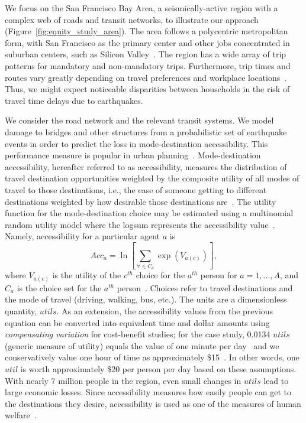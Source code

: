 We focus on the San Francisco Bay Area, a seismically-active region with a complex web of roads and transit networks, to illustrate our approach (Figure~\ref{fig:equity_study_area}). The area follows a polycentric metropolitan form, with San Francisco as the primary center and other jobs  concentrated in suburban centers, such as Silicon Valley~\cite{cervero_polycentrism_1997}. The region has a wide array of trip patterns for mandatory and non-mandatory trips. Furthermore, trip times and routes vary greatly depending on travel preferences and workplace locations~\cite{cervero_polycentrism_1997}. Thus,  we might expect noticeable disparities between households in the risk of travel time delays due to earthquakes. 


We consider the road network and the relevant transit systems. We  model damage to bridges and other structures from a probabilistic set of earthquake events in order to predict the loss in mode-destination accessibility. This performance measure is popular in urban planning~\cite[e.g.,][]{geurs_accessibility_2004,kockelman_travel_1997,waddell_incorporating_2002}. Mode-destination accessibility, hereafter referred to as accessibility, measures the distribution of travel destination opportunities weighted by the composite utility of all modes of travel to those destinations, i.e., the ease of someone getting to different destinations weighted by how desirable those destinations are~\cite{handy_measuring_1997,niemeier_accessibility:_1997}. The utility function for the mode-destination choice may be estimated using a multinomial random utility model where the logsum represents the accessibility value~\cite{manski_structural_1981,handy_measuring_1997,niemeier_accessibility:_1997}. Namely, accessibility for a particular agent $a$ is
\begin{equation}
Acc_a = \ln \left[ \sum_{\forall \in C_a} \exp (V_{a(c)}) \right],
\label{eq:acc}
\end{equation}
where $V_{a(c)}$ is the utility of the $c^{th}$ choice for the $a^{th}$ person for $a = 1, \ldots, A$, and $C_a$ is the choice set for the $a^{th}$ person~\cite{handy_measuring_1997}. Choices refer to travel destinations and the mode of travel (driving, walking, bus, etc.). The units are a dimensionless quantity, $utils$. As an extension, the accessibility values from the previous equation can be converted into equivalent time and dollar amounts using \emph{compensating variation} for cost-benefit studies; for the case study, 0.0134 $utils$ (generic measure of utility) equals the value of one minute per day~\cite{niemeier_accessibility:_1997,small_applied_1981,ory_personal_2013} and we conservatively value one hour of time as approximately \$15~\cite{united_states_department_of_transportation_revised_2011}. In other words, one $util$ is worth approximately \$20 per person per day based on these assumptions. With nearly 7 million people in the region, even small changes in $utils$ lead to large economic losses. Since accessibility measures how easily people can get to the destinations they desire, accessibility is used as one of the measures of human welfare~\cite[e.g.,][]{niemeier_accessibility:_1997}.

